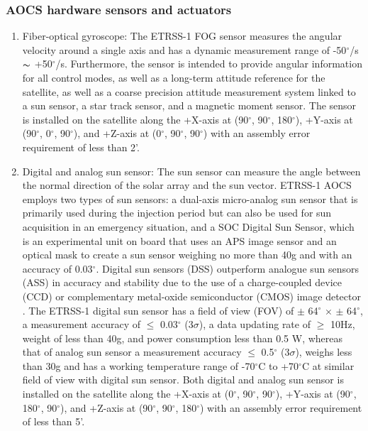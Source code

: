\documentclass[final,5p,times,twocolumn]{elsarticle}
\begin{document}
\subsubsection{AOCS hardware sensors and actuators}
\begin{enumerate}
	\item Fiber-optical gyroscope: The ETRSS-1 FOG sensor measures the angular velocity around a single axis and has a dynamic measurement range of -50$^{\circ}$/s $\thicksim$ +50$^{\circ}$/s. Furthermore, the sensor is intended to provide angular information for all control modes, as well as a long-term attitude reference for the satellite, as well as a coarse precision attitude measurement system linked to a sun sensor, a star track sensor, and a magnetic moment sensor. The sensor is installed on the satellite along the +X-axis at (90$^{\circ}$, 90$^{\circ}$, 180$^{\circ}$), +Y-axis at (90$^{\circ}$, 0$^{\circ}$, 90$^{\circ}$), and +Z-axis at (0$^{\circ}$, 90$^{\circ}$, 90$^{\circ}$) with an assembly error requirement of less than 2'. 
	\item Digital and analog sun sensor: The sun sensor can measure the angle between the normal direction of the solar array and the sun vector. ETRSS-1 AOCS employs two types of sun sensors: a dual-axis micro-analog sun sensor that is primarily used during the injection period but can also be used for sun acquisition in an emergency situation, and a SOC Digital Sun Sensor, which is an experimental unit on board that uses an APS image sensor and an optical mask to create a sun sensor weighing no more than 40g and with an accuracy of 0.03$^{\circ}$. Digital sun sensors (DSS) outperform analogue sun sensors (ASS) in accuracy and stability due to the use of a charge-coupled device (CCD) or complementary metal-oxide semiconductor (CMOS) image detector \cite{de2003novel}. The ETRSS-1 digital sun sensor has a field of view (FOV) of $\pm$ 64$^{\circ}$ $\times$ $\pm$ 64$^{\circ}$, a measurement accuracy of $\leq$ 0.03$^{\circ}$ (3$\sigma$), a data updating rate of $\geq$ 10Hz, weight of less than 40g, and power consumption less than 0.5 W, whereas that of analog sun sensor a measurement accuracy $\leq$ 0.5$^{\circ}$ (3$\sigma$), weighs less than 30g and has a working temperature range of -70$^{\circ}$C to +70$^{\circ}$C at similar field of view with digital sun sensor. Both digital and analog sun sensor is installed on the satellite along the +X-axis at (0$^{\circ}$, 90$^{\circ}$, 90$^{\circ}$), +Y-axis at (90$^{\circ}$, 180$^{\circ}$, 90$^{\circ}$), and +Z-axis at (90$^{\circ}$, 90$^{\circ}$, 180$^{\circ}$) with an assembly error requirement of less than 5'.

\end{enumerate}
\end{document}
